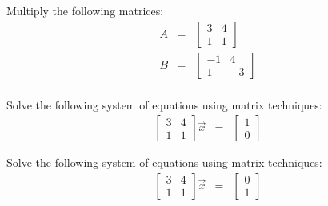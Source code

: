 

\begin{problem} 
\item Multiply the following matrices:
  \begin{eqnarray*}
    A & = & 
    \left[
      \begin{array}{rr}
        3 & 4 \\ 
        1 & 1
      \end{array}
    \right] \\
    B & = & 
    \left[
      \begin{array}{rr}
        -1 & 4 \\
         1 & -3
      \end{array}
    \right] \\
  \end{eqnarray*}

  \vspace{4em}

  \item Solve the following system of equations using matrix techniques:
  \begin{eqnarray*}
    \left[
      \begin{array}{rr}
        3 & 4 \\ 
        1 & 1
      \end{array}
    \right] 
    \vec{x} & = & 
    \left[
      \begin{array}{r}
        1 \\
        0
      \end{array}
    \right]
  \end{eqnarray*}

  \vfill

  \item Solve the following system of equations using matrix techniques:
  \begin{eqnarray*}
    \left[
      \begin{array}{rr}
        3 & 4 \\ 
        1 & 1
      \end{array}
    \right] 
    \vec{x} & = & 
    \left[
      \begin{array}{r}
        0 \\
        1
      \end{array}
    \right]
  \end{eqnarray*}

  \vfill

\end{problem}


